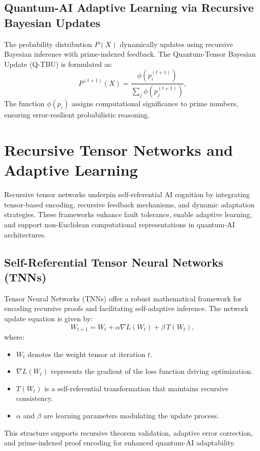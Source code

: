 \documentclass{article}
\theoremstyle{plain}
\begin{document}
\subsection{Quantum-AI Adaptive Learning via Recursive Bayesian Updates}

The probability distribution $P(X)$ dynamically updates using recursive Bayesian inference with prime-indexed feedback. The Quantum-Tensor Bayesian Update (Q-TBU) is formulated as:
\begin{equation}
    P^{(t+1)}(X) = \frac{\phi(p_i^{(t+1)})}{\sum_{j} \phi(p_j^{(t+1)})},
\end{equation}
The function $\phi(p_i)$ assigns computational significance to prime numbers, ensuring error-resilient probabilistic reasoning. 

\section{Recursive Tensor Networks and Adaptive Learning}

Recursive tensor networks underpin self-referential AI cognition by integrating tensor-based encoding, recursive feedback mechanisms, and dynamic adaptation strategies. These frameworks enhance fault tolerance, enable adaptive learning, and support non-Euclidean computational representations in quantum-AI architectures.

\subsection{Self-Referential Tensor Neural Networks (TNNs)}

Tensor Neural Networks (TNNs) offer a robust mathematical framework for encoding recursive proofs and facilitating self-adaptive inference. The network update equation is given by:
\begin{equation}
W_{t+1} = W_t + \alpha \nabla L(W_t) + \beta\, T(W_t),
\end{equation}
where:
\begin{itemize}
    \item \(W_t\) denotes the weight tensor at iteration \(t\).
    \item \(\nabla L(W_t)\) represents the gradient of the loss function driving optimization.
    \item \(T(W_t)\) is a self-referential transformation that maintains recursive consistency.
    \item \(\alpha\) and \(\beta\) are learning parameters modulating the update process.
\end{itemize}
This structure supports recursive theorem validation, adaptive error correction, and prime-indexed proof encoding for enhanced quantum-AI adaptability.
\end{document}

